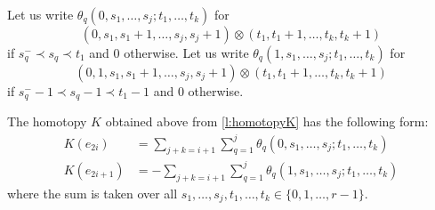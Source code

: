 \begin{definition}
	Let us write $\theta_q(0,s_1,\ldots,s_j;t_1,\ldots,t_k)$ for
	\[(0,s_1,s_1+1,\ldots,s_j,s_j+1)\otimes (t_1,t_1+1,\ldots,t_k,t_k+1)\]
	if $s_q^-\prec s_q\prec t_1$ and $0$ otherwise.
	Let us write $\theta_q(1,s_1,\ldots,s_j;t_1,\ldots,t_k)$ for
	\[(0,1,s_1,s_1+1,\ldots,s_j,s_j+1)\otimes (t_1,t_1+1,\ldots,t_k,t_k+1)\]
	if $s_q^--1\prec s_q-1\prec t_1-1$ and $0$ otherwise.
\end{definition}

\begin{lemma}\label{l:homotopyK'}
	The homotopy $K$ obtained above from \cref{l:homotopyK} has the following form:
	\begin{align} \label{eq:homotopyK'1}
		K(e_{2i}) &= \sum_{j+k = i+1}{\sum_{q=1}^j{\theta_q(0,s_1,\ldots,s_j;t_1,\ldots,t_k)}} \\ \label{eq:homotopyK'2}
		K(e_{2i+1}) &= -\sum_{j+k = i+1}{\sum_{q=1}^j{\theta_q(1,s_1,\ldots,s_j;t_1,\ldots,t_k)}}
	\end{align}
	where the sum is taken over all $s_1,\ldots,s_j,t_1,\ldots,t_k\in \{0,1,\ldots,r-1\}$.
\end{lemma}

